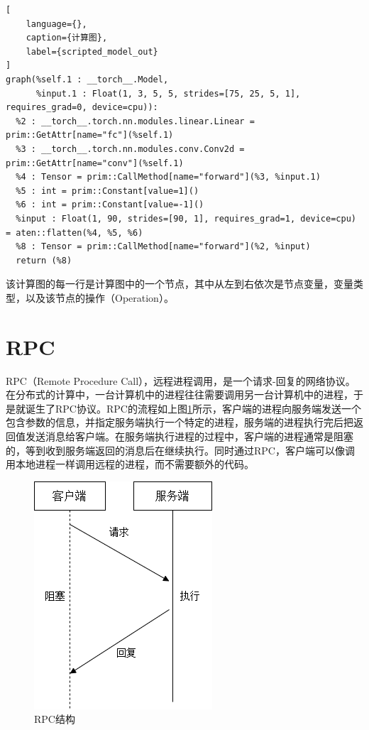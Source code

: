\begin{lstlisting}[
    language={},
    caption={计算图},
    label={scripted_model_out}
]
graph(%self.1 : __torch__.Model,
      %input.1 : Float(1, 3, 5, 5, strides=[75, 25, 5, 1], requires_grad=0, device=cpu)):
  %2 : __torch__.torch.nn.modules.linear.Linear = prim::GetAttr[name="fc"](%self.1)
  %3 : __torch__.torch.nn.modules.conv.Conv2d = prim::GetAttr[name="conv"](%self.1)
  %4 : Tensor = prim::CallMethod[name="forward"](%3, %input.1)
  %5 : int = prim::Constant[value=1]()
  %6 : int = prim::Constant[value=-1]()
  %input : Float(1, 90, strides=[90, 1], requires_grad=1, device=cpu) = aten::flatten(%4, %5, %6)
  %8 : Tensor = prim::CallMethod[name="forward"](%2, %input)
  return (%8)
\end{lstlisting}

该计算图的每一行是计算图中的一个节点，其中从左到右依次是节点变量，变量类型，以及该节点的操作（Operation）。


\section{RPC}


RPC（Remote Procedure Call），远程进程调用，是一个请求-回复的网络协议。在分布式的计算中，一台计算机中的进程往往需要调用另一台计算机中的进程，于是就诞生了RPC协议。RPC的流程如上图\ref{rpc}所示，客户端的进程向服务端发送一个包含参数的信息，并指定服务端执行一个特定的进程，服务端的进程执行完后把返回值发送消息给客户端。在服务端执行进程的过程中，客户端的进程通常是阻塞的，等到收到服务端返回的消息后在继续执行。同时通过RPC，客户端可以像调用本地进程一样调用远程的进程，而不需要额外的代码。

\begin{figure}[h!]
    \centering
    \includegraphics[width=180bp]{figure/rpc.png}
    \caption{RPC结构}
    \label{rpc}
\end{figure}

